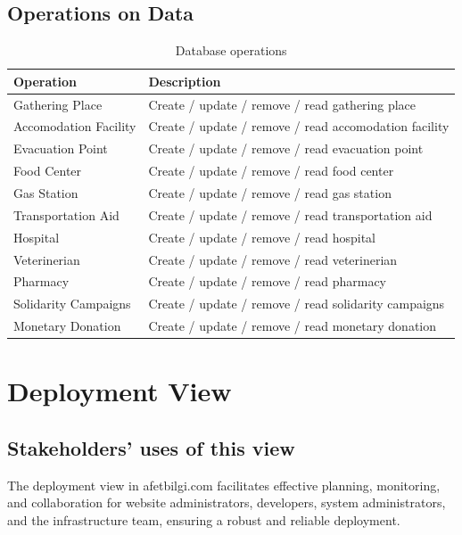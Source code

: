 \documentclass[12pt]{report}
\begin{document}
\subsection{Operations on Data}
\renewcommand{\arraystretch}{2}
\begin{table}[H]
    \centering
    \begin{tabular}{|l|p{10cm}|}
        \hline
    \textbf{Operation}             & \textbf{Description} \\ \hline
    Gathering Place            & Create / update / remove / read gathering place \\ \hline
    Accomodation Facility      & Create / update / remove / read accomodation facility  \\ \hline
    Evacuation Point           & Create / update / remove / read evacuation point \\ \hline
    Food Center                & Create / update / remove / read food center \\ \hline
    Gas Station                & Create / update / remove / read gas station \\ \hline
    Transportation Aid         & Create / update / remove / read transportation aid \\ \hline
    Hospital                   & Create / update / remove / read hospital \\ \hline
    Veterinerian               & Create / update / remove / read veterinerian \\ \hline
    Pharmacy                   & Create / update / remove / read pharmacy \\ \hline
    Solidarity Campaigns       & Create / update / remove / read solidarity campaigns \\ \hline
    Monetary Donation          & Create / update / remove / read monetary donation \\ \hline
    \end{tabular}
    \caption{Database operations}
\end{table}

\section{Deployment View}

\subsection{Stakeholders' uses of this view}
The deployment view in afetbilgi.com facilitates effective planning, monitoring, and collaboration for website administrators, 
developers, system administrators, and the infrastructure team, ensuring a robust and reliable deployment.
\end{document}
